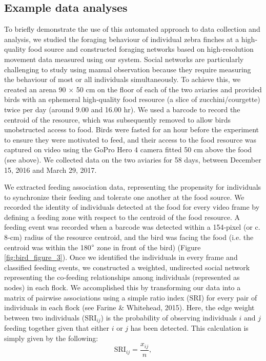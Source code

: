\documentclass[11pt,a4paper,oneside]{book}
\begin{document}
\begin{doublespace}
\subsection{Example data analyses}
To briefly demonstrate the use of this automated approach to data collection and analysis, we studied the foraging behaviour of individual zebra finches at a high‐quality food source and constructed foraging networks based on high‐resolution movement data measured using our system. Social networks are particularly challenging to study using manual observation because they require measuring the behaviour of most or all individuals simultaneously. To achieve this, we created an arena 90 $\times$ 50 cm on the floor of each of the two aviaries and provided birds with an ephemeral high‐quality food resource (a slice of zucchini/courgette) twice per day (around 9.00 and 16.00 hr). We used a barcode to record the centroid of the resource, which was subsequently removed to allow birds unobstructed access to food. Birds were fasted for an hour before the experiment to ensure they were motivated to feed, and their access to the food resource was captured on video using the GoPro Hero 4 camera fitted 50 cm above the food (see above). We collected data on the two aviaries for 58 days, between December 15, 2016 and March 29, 2017.

We extracted feeding association data, representing the propensity for individuals to synchronize their feeding and tolerate one another at the food source. We recorded the identity of individuals detected at the food for every video frame by defining a feeding zone with respect to the centroid of the food resource. A feeding event was recorded when a barcode was detected within a 154‐pixel (or c. 8‐cm) radius of the resource centroid, and the bird was facing the food (i.e. the centroid was within the 180$\degree$ zone in front of the bird) (Figure \ref{fig:bird_figure_3}). Once we identified the individuals in every frame and classified feeding events, we constructed a weighted, undirected social network representing the co‐feeding relationships among individuals (represented as nodes) in each flock. We accomplished this by transforming our data into a matrix of pairwise associations using a simple ratio index ($\mathrm{SRI}$) for every pair of individuals in each flock (see Farine & Whitehead, 2015). Here, the edge weight between two individuals ($\mathrm{SRI}_{ij}$) is the probability of observing individuals $i$ and $j$ feeding together given that either $i$ or $j$ has been detected. This calculation is simply given by the following:
\begin{equation}
    \mathrm{SRI}_{ij} = \frac{x_{ij}}{n},
\end{equation}


\end{doublespace}
\end{document}
